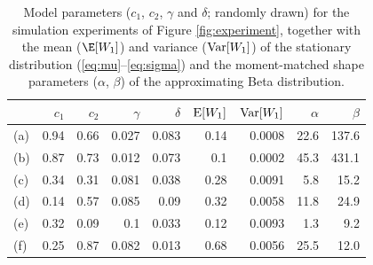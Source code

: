 \begin{table}
\caption{Model parameters ($c_1$, $c_2$, $\gamma$ and $\delta$; randomly drawn) for the simulation experiments of Figure \ref{fig:experiment}, together with the mean ($\E[W_1]$) and variance ($\textnormal{Var}[W_1]$) of the stationary distribution (\ref{eq:mu}--\ref{eq:sigma}) and the moment-matched shape parameters ($\alpha$, $\beta$) of the approximating Beta distribution.}\label{tbl:experiment}
\begin{tabular}{lrrrrrrrr}
\toprule
 & $c_1$ & $c_2$ & $\gamma$ & $\delta$ & $\textnormal{E}[W_1]$ & $\textnormal{Var}[W_1]$ & $\alpha$ & $\beta$ \\
\midrule
(a) & 0.94 & 0.66 & 0.027 & 0.083 & 0.14 & 0.0008 & 22.6 & 137.6 \\
(b) & 0.87 & 0.73 & 0.012 & 0.073 & 0.1 & 0.0002 & 45.3 & 431.1 \\
(c) & 0.34 & 0.31 & 0.081 & 0.038 & 0.28 & 0.0091 & 5.8 & 15.2 \\
(d) & 0.14 & 0.57 & 0.085 & 0.09 & 0.32 & 0.0058 & 11.8 & 24.9 \\
(e) & 0.32 & 0.09 & 0.1 & 0.033 & 0.12 & 0.0093 & 1.3 & 9.2 \\
(f) & 0.25 & 0.87 & 0.082 & 0.013 & 0.68 & 0.0056 & 25.5 & 12.0 \\
\bottomrule
\end{tabular}
\end{table}
